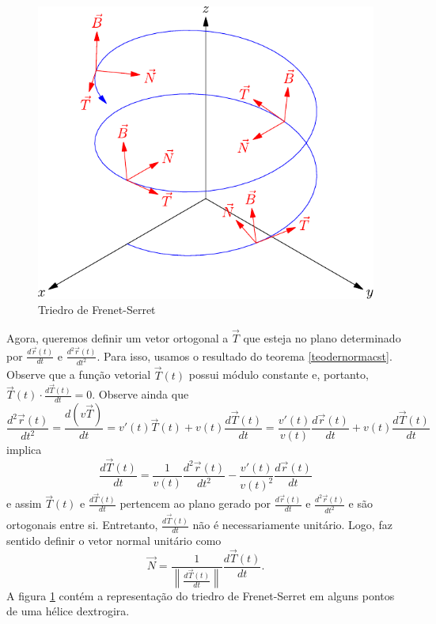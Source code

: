 \begin{figure}%
\begin{center}
    \includegraphics{./cap_curvas/figs/helice_TNB}
\caption{Triedro de Frenet-Serret}\label{Frenet_Serret}
  \end{center}
\end{figure}


Agora, queremos definir um vetor ortogonal a $\vec{T}$ que esteja no plano determinado por $\frac{d\vec{r}(t)}{dt}$ e $\frac{d^2\vec{r}(t)}{dt^2}$. Para isso, usamos o resultado do teorema \ref{teodernormacst}. Observe que a função vetorial $\vec{T}(t)$ possui módulo constante e, portanto, $\vec{T}(t)\cdot \frac{d\vec{T}(t)}{dt}=0$. Observe ainda que 
$$
\frac{d^2\vec{r}(t)}{dt^2}=\frac{d (v \vec{T} )}{dt} = v'(t) \vec{T}(t) + v(t) \frac{d \vec{T}(t)}{dt} = \frac{v'(t)}{v(t)} \frac{d\vec{r}(t)}{dt}+ v(t) \frac{d\vec{T}(t)}{dt}
$$
implica
$$ \frac{d\vec{T}(t)}{dt} = \frac{1}{v(t)} \frac{d^2 \vec{r}(t)}{dt^2} - \frac{v'(t)}{v(t)^2} \frac{d \vec{r}(t)}{dt}
$$
e assim 
$\vec{T}(t)$ e $\frac{d\vec{T}(t)}{dt}$ pertencem ao plano gerado por $\frac{d\vec{r}(t)}{dt} $ e $\frac{d^2\vec{r}(t)}{dt^2}$ e são ortogonais entre si. Entretanto, $\frac{d\vec{T}(t)}{dt}$ não é necessariamente unitário. Logo, faz sentido definir o vetor normal unitário como
$$
\vec{N}=\frac{1}{\left\|\frac{d\vec{T}(t)}{dt}\right\|} \frac{d \vec{T}(t)}{dt}.
$$
A figura \ref{Frenet_Serret} contém a representação do triedro de Frenet-Serret em alguns pontos de uma hélice dextrogira.

